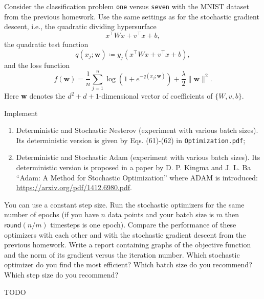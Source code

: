 \documentclass{../kin_math}
\begin{document}
\begin{questions}
  \question Consider the classification problem \texttt{one} versus \texttt{seven} with the MNIST dataset from the previous homework. Use the same settings as for the stochastic gradient descent, i.e., the quadratic dividing hypersurface
  \begin{equation*}
    x^\top W x + v^\top x + b,
  \end{equation*}
  the quadratic test function
  \begin{equation*}
    q(x_j; \textbf{w}) \coloneqq y_j\left(x^\top W x + v^\top x + b\right),
  \end{equation*}
  and the loss function
  \begin{equation*}
    f(\textbf{w}) = \frac{1}{n} \sum_{j = 1}^n \log\left(1 + e^{-q(x_j; \textbf{w})}\right) + \frac{\lambda}{2} \lVert \textbf{w} \rVert^2.
  \end{equation*}
  Here \textbf{w} denotes the $d^2 + d + 1$-dimensional vector of coefficients of $\{W, v, b\}$.

  Implement
  \begin{enumerate}
    \item Deterministic and Stochastic Nesterov (experiment with various batch sizes). Its deterministic version is given by Eqs. (61)-(62) in \texttt{Optimization.pdf};
    \item Deterministic and Stochastic Adam (experiment with various batch sizes). Its deterministic version is proposed in a paper by D. P. Kingma and J. L. Ba ``Adam: A Method for Stochastic Optimization'' where ADAM is introduced: \url{https://arxiv.org/pdf/1412.6980.pdf}.
  \end{enumerate}
  You can use a constant step size. Run the stochastic optimizers for the same number of epochs (if you have $n$ data points and your batch size is $m$ then $\textsf{round}(n / m)$ timesteps is one epoch). Compare the performance of these optimizers with each other and with the stochastic gradient descent from the previous homework. Write a report containing graphs of the objective function and the norm of its gradient versus the iteration number. Which stochastic optimizer do you find the most efficient? Which batch size do you recommend? Which step size do you recommend?
  \begin{solution}
    TODO
  \end{solution}


\end{questions}
\end{document}
